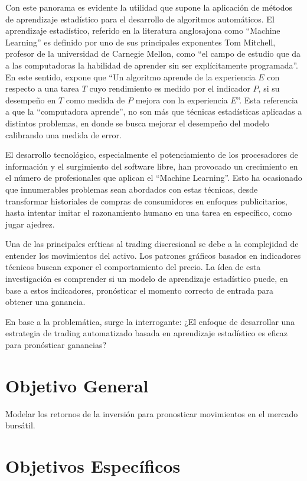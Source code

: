 \documentclass[a4paper,12pt]{Latex/Classes/PhDthesisPSnPDF}
\begin{document}
Con este panorama es evidente la utilidad que supone la aplicación de métodos de aprendizaje estadístico para el desarrollo de algoritmos automáticos. El aprendizaje estadístico, referido en la literatura anglosajona como “Machine Learning” es definido por uno de sus principales exponentes Tom Mitchell, profesor de la universidad de Carnegie Mellon, como “el campo de estudio que da a las computadoras la habilidad de aprender sin ser explícitamente programada”. En este sentido, expone que “Un algoritmo aprende de la experiencia $E$ con respecto a una tarea $T$ cuyo rendimiento es medido por el indicador $P$, si su desempeño en $T$ como medida de $P$ mejora con la experiencia $E$”. Esta referencia a que la “computadora aprende”, no son más que técnicas estadísticas aplicadas a distintos problemas, en donde se busca mejorar el desempeño del modelo calibrando una medida de error.

El desarrollo tecnológico, especialmente el potenciamiento de los procesadores de información y el surgimiento del software libre, han provocado un crecimiento en el número de profesionales que aplican el “Machine Learning”. Esto ha ocasionado que innumerables problemas sean abordados con estas técnicas, desde transformar historiales de compras de consumidores en enfoques publicitarios, hasta intentar imitar el razonamiento humano en una tarea en específico, como jugar ajedrez.

Una de las principales críticas al trading discresional se debe a la complejidad de entender los movimientos del activo. Los patrones gráficos basados en indicadores técnicos buscan exponer el comportamiento del precio. La ídea de esta investigación es comprender si un modelo de aprendizaje estadístico puede, en base a estos indicadores, pronósticar el momento correcto de entrada para obtener una ganancia.

En base a la problemática, surge la interrogante: ¿El enfoque de desarrollar una estrategia de trading automatizado basada en aprendizaje estadístico es eficaz para pronósticar ganancias?

\section{Objetivo General}

Modelar los retornos de la inversión para pronosticar movimientos en el mercado bursátil.

\section{Objetivos Específicos}
\end{document}
